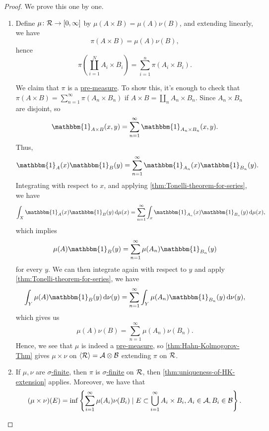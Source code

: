\begin{proof}
	We prove this one by one.
	\begin{enumerate}
		\item Define \(\mu \colon \mathcal{\MakeUppercase{r}} \to [0, \infty ]\) by \(\mu (A \times B) = \mu (A)\nu (B)\), and extending linearly, we have
		      \[
			      \pi (A\times B) = \mu (A)\nu (B),
		      \]
		      hence
		      \[
			      \pi \left(\coprod\limits_{i=1}^{N} A_{i} \times B_{i} \right) = \sum\limits_{i=1}^{n} \pi (A_{i} \times B_{i}).
		      \]

		      We claim that \(\pi \) is a \hyperref[def:pre-measure]{pre-measure}. To show this, it's enough to check that \(\pi (A\times B) = \sum\limits_{n=1}^{\infty} \pi (A_{n} \times B_{n} )\)
		      if \(A\times B = \coprod\limits_{n}A_{n} \times B_{n}  \). Since \(A_{n} \times B_{n} \) are disjoint, so
		      \[
			      \mathbbm{1}_{A\times B}(x, y) = \sum\limits_{n=1}^{\infty} \mathbbm{1}_{A_{n} \times B_{n} }(x, y).
		      \]
		      Thus,
		      \[
			      \mathbbm{1}_{A} (x)\mathbbm{1}_{B} (y) = \sum\limits_{n=1}^{\infty} \mathbbm{1}_{A_{n} }(x)\mathbbm{1}_{B_{n}}(y).
		      \]
		      Integrating with respect to \(x\), and applying \autoref{thm:Tonelli-theorem-for-series}, we have
		      \[
			      \int _X \mathbbm{1}_{A} (x)\mathbbm{1}_{B}(y)\,\mathrm{d} \mu (x) = \sum\limits_{n=1}^{\infty} \int _x \mathbbm{1}_{A_{n} }(x)\mathbbm{1}_{B_{n} }(y)\,\mathrm{d} \mu (x),
		      \]
		      which implies
		      \[
			      \mu (A)\mathbbm{1}_{B} (y) = \sum\limits_{n=1}^{\infty} \mu (A_{n} )\mathbbm{1}_{B_{n} }(y)
		      \]
		      for every \(y\). We can then integrate again with respect to \(y\) and apply \autoref{thm:Tonelli-theorem-for-series}, we have
		      \[
			      \int _Y \mu (A)\mathbbm{1}_{B}(y)\,\mathrm{d} \nu (y) = \sum\limits_{n=1}^{\infty} \int _Y \mu (A_{n} )\mathbbm{1}_{B_{n} }(y)\,\mathrm{d} \nu (y),
		      \]
		      which gives us
		      \[
			      \mu (A)\nu (B) = \sum\limits_{n=1}^{\infty} \mu (A_{n} )\nu (B_{n} ).
		      \]
		      Hence, we see that \(\mu\) is indeed a \hyperref[def:pre-measure]{pre-measure}, so  \autoref{thm:Hahn-Kolmogorov-Thm} gives \(\mu \times \nu \) on \(\left< \mathcal{\MakeUppercase{r}}  \right> = \mathcal{\MakeUppercase{a}} \otimes \mathcal{\MakeUppercase{b}}  \)
		      extending \(\pi \) on \(\mathcal{\MakeUppercase{r}} \).
		\item If \(\mu , \nu \) are \hyperref[def:finite-measure]{\(\sigma\)-finite}, then \(\pi \) is  \hyperref[def:finite-measure]{\(\sigma\)-finite} on \(\mathcal{\MakeUppercase{r}} \), then
		      \autoref{thm:uniqueness-of-HK-extension} applies. Moreover, we have that
		      \[
			      (\mu \times \nu )(E) = \inf \left\{\sum\limits_{i=1}^{\infty} \mu (A_{i})\nu (B_{i})\mid E\subset \bigcup\limits_{i=1}^{\infty} A_{i} \times B_{i}, A_{i} \in \mathcal{\MakeUppercase{a}} , B_{i} \in \mathcal{\MakeUppercase{b}} \right\}.
		      \]
	\end{enumerate}
\end{proof}

